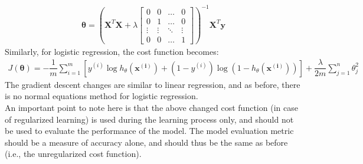 \documentclass[a4paper, 12pt]{report}
\begin{document}
\begin{align*}
\bm{\theta} = \left(\bm{X}^T\bm{X} + \lambda
\begin{bmatrix}
    0 & 0 & \dots & 0 \\
    0 & 1 & \dots & 0 \\
    \vdots & \vdots & \ddots & \vdots \\
    0 & 0 & \dots & 1
\end{bmatrix}
\right)^{-1}\bm{X}^T\bm{y}
\end{align*}
Similarly, for logistic regression, the cost function becomes:
\begin{align*}
J\left(\bm{\theta}\right) = -\dfrac{1}{m}\sum_{i=1}^{m}\left[y^{\left(i\right)}\log h_{\theta}\left(\bm{x^{\left(i\right)}}\right) + \left(1 - y^{\left(i\right)}\right)\log \left(1 - h_{\theta}\left(\bm{x^{\left(i\right)}}\right)\right)\right] + \dfrac{\lambda}{2m}\sum_{j=1}^{n}\theta_j^2
\end{align*}
The gradient descent changes are similar to linear regression, and as before, there is no normal equations method for logistic regression. \\
\break
An important point to note here is that the above changed cost function (in case of regularized learning) is used during the learning process only, and should not be used to evaluate the performance of the model. The model evaluation metric should be a measure of accuracy alone, and should thus be the same as before (i.e., the unregularized cost function).
\end{document}
